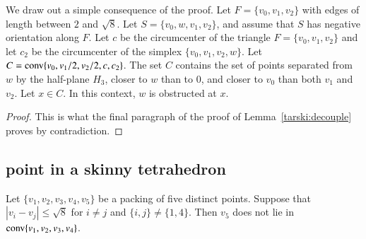 \begin{tarskidata}
\begin{tarski}

\begin{lemma}
We draw out a simple consequence of the proof.
Let
$F=\{v_0,v_1,v_2\}$ with edges of length between $2$ and $\sqrt8$.
Let $S=\{v_0,w,v_1,v_2\}$, and assume that $S$ has negative
orientation along $F$. Let $c$ be the circumcenter of the triangle
$F=\{v_0,v_1,v_2\}$ and let $c_2$ be the circumcenter of the simplex
$\{v_0,v_1,v_2,w\}$. Let
$C={\operatorname{conv}}\{v_0,v_1/2,v_2/2,c,c_2\}$.  The set $C$ contains the set of points
separated from $w$ by the half-plane $H_3$, closer to $w$ than to
$0$, and closer to $v_0$ than both $v_1$ and $v_2$. Let $x\in C$.
In this context, $w$ is obstructed at $x$.
\end{lemma}

\begin{proof} This is what the final paragraph of the  proof of Lemma~\ref{tarski:decouple} proves by contradiction.
\end{proof}
\end{tarski}










\begin{tarski}
\subsection{point in a skinny tetrahedron}

\begin{lemma} 
Let 
$\{v_1,v_2,v_3,v_4,v_5\}$ be a packing of
five distinct points.  Suppose that $|v_i-v_j|\le
\sqrt8$ for $i\ne j$ and $\{i,j\}\ne\{1,4\}$. Then $v_5$ does not lie
in ${\operatorname{conv}}\{v_1,v_2,v_3,v_4\}$.
\end{lemma}


\end{tarski}
\end{tarskidata}
